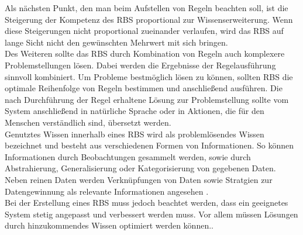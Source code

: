 Als nächsten Punkt, den man beim Aufstellen von Regeln beachten soll, ist die Steigerung der Kompetenz des \ac{RBS} proportional zur Wissenserweiterung. Wenn diese Steigerungen nicht proportional zueinander verlaufen, wird das \ac{RBS} auf lange Sicht nicht den gewünschten Mehrwert mit sich bringen.\\
Des Weiteren sollte das \ac{RBS} durch Kombination von Regeln auch komplexere Problemstellungen lösen. Dabei werden die Ergebnisse der Regelausführung sinnvoll kombiniert. Um Probleme bestmöglich lösen zu können, sollten \ac{RBS} die optimale Reihenfolge von Regeln bestimmen und anschließend ausführen. Die nach Durchführung der Regel erhaltene Lösung zur Problemstellung sollte vom System anschließend in natürliche Sprache oder in Aktionen, die für den Menschen verständlich sind, übersetzt werden.\\
Genutztes Wissen innerhalb eines \ac{RBS} wird als problemlösendes Wissen bezeichnet und besteht aus verschiedenen Formen von Informationen. So können Informationen durch Beobachtungen gesammelt werden, sowie durch Abstrahierung, Generalisierung oder Kategorisierung von gegebenen Daten. Neben reinen Daten werden Verknüpfungen von Daten sowie Stratgien zur Datengewinnung als relevante Informationen angesehen \cite{Hayes-Roth:1985:RS:4284.4286}.\\
Bei der Erstellung eines \ac{RBS} muss jedoch beachtet werden, dass ein geeignetes System stetig angepasst und verbessert werden muss. Vor allem müssen Lösungen durch hinzukommendes Wissen optimiert werden können.\cite{Hayes-Roth:1985:RS:4284.4286}.



